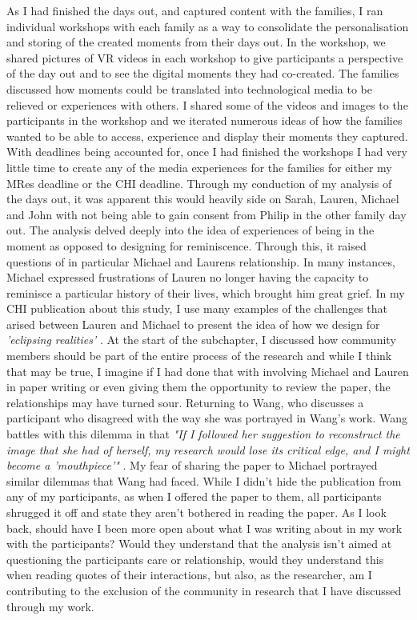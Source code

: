 As I had finished the days out, and captured content with the families, I ran individual workshops with each family as a way to consolidate the personalisation and storing of the created moments from their days out. In the workshop, we shared pictures of VR videos in each workshop to give participants a perspective of the day out and to see the digital moments they had co-created. The families discussed how moments could be translated into technological media to be relieved or experiences with others. I shared some of the videos and images to the participants in the workshop and we iterated numerous ideas of how the families wanted to be able to access, experience and display their moments they captured. With deadlines being accounted for, once I had finished the workshops I had very little time to create any of the media experiences for the families for either my MRes deadline or the CHI deadline. Through my conduction of my analysis of the days out, it was apparent this would heavily side on Sarah, Lauren, Michael and John with not being able to gain consent from Philip in the other family day out. The analysis delved deeply into the idea of experiences of being in the moment as opposed to designing for reminiscence. Through this, it raised questions of in particular Michael and Laurens relationship. In many instances, Michael expressed frustrations of Lauren no longer having the capacity to reminisce a particular history of their lives, which brought him great grief. In my CHI publication about this study, I use many examples of the challenges that arised between Lauren and Michael to present the idea of how we design for \textit{'eclipsing realities'} \citep{hodge_exploring_2018}. At the start of the subchapter, I discussed how community members should be part of the entire process of the research and while I think that may be true, I imagine if I had done that with involving Michael and Lauren in paper writing or even giving them the opportunity to review the paper, the relationships may have turned sour. Returning to Wang, who discusses a participant who disagreed with the way she was portrayed in Wang's work. Wang battles with this dilemma in that \textit{"If I followed her suggestion to reconstruct the image that she had of herself, my research would lose its critical edge, and I might become a 'mouthpiece'"} \citep{wang_construction_2013}. My fear of sharing the paper to Michael portrayed similar dilemmas that Wang had faced. While I didn't hide the publication from any of my participants, as when I offered the paper to them, all participants shrugged it off and state they aren't bothered in reading the paper. As I look back, should have I been more open about what I was writing about in my work with the participants? Would they understand that the analysis isn't aimed at questioning the participants care or relationship, would they understand this when reading quotes of their interactions, but also, as the researcher, am I contributing to the exclusion of the community in research that I have discussed through my work.  

